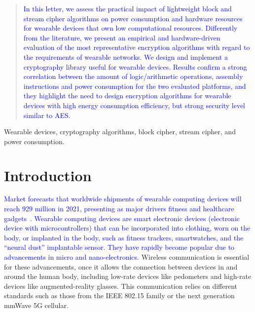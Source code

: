 \documentclass[journal]{IEEEtran}
\newcommand{\rever}{\textcolor{blue}}
\begin{document}
\begin{abstract}
%
\rever{In this letter, we assess the practical impact of lightweight block and stream cipher algorithms on power consumption and hardware resources for wearable devices that own low computational resources. Differently from the literature, we present an empirical and hardware-driven evaluation of the most representative encryption algorithms with regard to the requirements of wearable networks. We design and implement a cryptography library useful for wearable devices. Results confirm a strong correlation between the amount of logic/arithmetic operations, assembly instructions and power consumption for the two evaluated platforms, and they highlight the need to design encryption algorithms for wearable devices with high energy consumption efficiency, but strong security level similar to AES.} 
\end{abstract}
\vspace{-0.3cm}
\begin{IEEEkeywords}
Wearable devices, cryptography algorithms, block cipher, stream cipher, and power consumption. 
\vspace{-0.1cm}
\end{IEEEkeywords}



\IEEEpeerreviewmaketitle

\vspace{-0.1cm}
\section{Introduction}
%


\rever{Market forecasts that worldwide shipments of wearable computing devices will reach 929 million in 2021, presenting as major drivers fitness and healthcare gadgets~\cite{cheung2018emerging}. Wearable computing devices are smart electronic devices (electronic device with microcontrollers) that can be incorporated into clothing, worn on the body, or implanted in the body, such as fitness trackers, smartwatches, and the ``neural dust'' implantable sensor. %
They have rapidly become popular due to advancements in micro and nano-electronics.}
Wireless communication is essential for these advancements, once it allows the connection between devices in and around the human body, including low-rate devices like pedometers and high-rate devices like augmented-reality glasses. This communication relies on different standards such as those from the IEEE 802.15 family or the next generation mmWave 5G cellular. 
\end{document}
